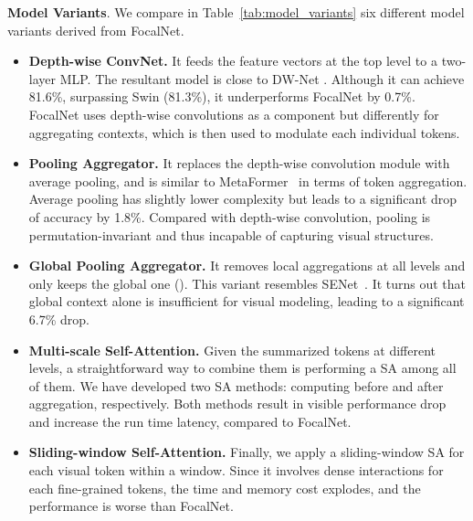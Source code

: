 \documentclass{article}
\begin{document}
\textbf{Model Variants}. 
We compare in Table~\ref{tab:model_variants} six different model variants derived from FocalNet.
\begin{itemize}[leftmargin=*]
    \item \textbf{Depth-wise ConvNet.} It feeds the feature vectors at the top level  to a two-layer MLP. The resultant model is close to DW-Net \cite{han2021demystifying}. Although it can achieve 81.6\%, surpassing Swin (81.3\%), it underperforms FocalNet by 0.7\%. FocalNet uses depth-wise convolutions as a component but differently for aggregating contexts, which is then used to modulate each individual tokens.
    \item \textbf{Pooling Aggregator.} It replaces the depth-wise convolution module with average pooling, and is similar to MetaFormer~\cite{yu2021metaformer} in terms of token aggregation. Average pooling has slightly lower complexity but leads to a significant drop of accuracy by 1.8\%. Compared with depth-wise convolution, pooling is permutation-invariant and thus incapable of capturing visual structures.
    \item \textbf{Global Pooling Aggregator.} It removes local aggregations at all levels and only keeps the global one (). This variant resembles SENet~\cite{hu2018squeeze}. It turns out that global context alone is insufficient for visual modeling, leading to a significant 6.7\% drop.
    \item \textbf{Multi-scale Self-Attention.} Given the summarized tokens at different levels, a straightforward way to combine them is performing a SA among all of them. We have developed two SA methods: computing  before and after aggregation, respectively. Both methods result in visible performance drop and increase the run time latency, compared to FocalNet.
\item \textbf{Sliding-window Self-Attention.}  Finally, we apply a sliding-window SA for each visual token within a window. Since it involves dense interactions for each fine-grained tokens, the time and memory cost explodes, and the performance is worse than FocalNet.
    \vspace{-2mm}
\end{itemize}
\end{document}

